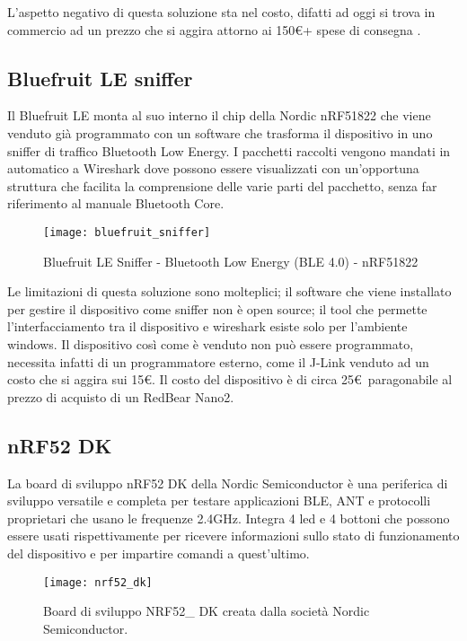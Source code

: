 L'aspetto negativo di questa soluzione sta nel costo, difatti ad oggi si trova in commercio ad un prezzo che si aggira attorno ai 150\euro  + spese di consegna \cite{ubertooth_reseller_web}.

\subsection*{Bluefruit LE sniffer}
Il Bluefruit LE monta al suo interno il chip della Nordic nRF51822 che viene venduto già programmato con un software che trasforma il dispositivo in uno sniffer di traffico Bluetooth Low Energy. I pacchetti raccolti vengono mandati in automatico a Wireshark  dove possono essere visualizzati con un'opportuna struttura che facilita la comprensione delle varie parti del pacchetto, senza far riferimento al manuale Bluetooth Core.

\begin{figure}[H]
\texttt{[image: bluefruit\_sniffer]}
\centering
\caption{Bluefruit LE Sniffer - Bluetooth Low Energy (BLE 4.0) - nRF51822}
\end{figure}

Le limitazioni di questa soluzione sono molteplici; il software che viene installato per gestire il dispositivo come sniffer non è open source; il tool che permette l'interfacciamento tra il dispositivo e wireshark esiste solo per l'ambiente windows. Il dispositivo così come è venduto non può essere programmato, necessita infatti di un programmatore esterno, come il J-Link venduto ad un costo che si aggira sui 15\euro .
Il costo del dispositivo è di circa 25\euro\ paragonabile al prezzo di acquisto di un RedBear Nano2.

\newpage 

\subsection*{nRF52 DK}
La board di sviluppo nRF52 DK della Nordic Semiconductor è una periferica di sviluppo versatile e completa per testare applicazioni BLE, ANT e protocolli proprietari che usano le frequenze 2.4GHz. Integra 4 led e 4 bottoni che possono essere usati rispettivamente per ricevere informazioni sullo stato di funzionamento del dispositivo e per impartire comandi a quest'ultimo.

\begin{figure}[H]
\texttt{[image: nrf52\_dk]}
\centering
\caption{Board di sviluppo NRF52\_ DK creata dalla società Nordic Semiconductor.}
\end{figure}

